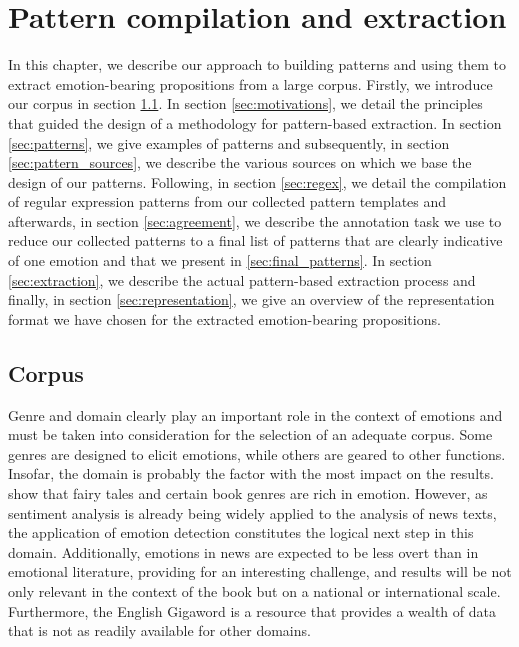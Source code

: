 
\chapter{Pattern compilation and extraction} %

\label{ch:patterns} %

In this chapter, we describe our approach to building patterns and using them to extract emotion-bearing propositions from a large corpus. Firstly, we introduce our corpus in section \ref{sec:corpus_selection}. In section \ref{sec:motivations}, we detail the principles that guided the design of a methodology for pattern-based extraction. In section \ref{sec:patterns}, we give examples of patterns and subsequently, in section \ref{sec:pattern_sources}, we describe the various sources on which we base the design of our patterns. Following, in section \ref{sec:regex}, we detail the compilation of regular expression patterns from our collected pattern templates and afterwards, in section \ref{sec:agreement}, we describe the annotation task we use to reduce our collected patterns to a final list of patterns that are clearly indicative of one emotion and that we present in \ref{sec:final_patterns}. In section \ref{sec:extraction}, we describe the actual pattern-based extraction process and finally, in section \ref{sec:representation}, we give an overview of the representation format we have chosen for the extracted emotion-bearing propositions.

\section{Corpus} \label{sec:corpus_selection}

Genre and domain clearly play an important role in the context of emotions and must be taken into consideration for the selection of an adequate corpus. Some genres are designed to elicit emotions, while others are geared to other functions. Insofar, the domain is probably the factor with the most impact on the results. \cite{emotions_novels_fairy_tales} show that fairy tales and certain book genres are rich in emotion. However, as sentiment analysis is already being widely applied to the analysis of news texts, the application of emotion detection constitutes the logical next step in this domain. Additionally, emotions in news are expected to be less overt than in emotional literature, providing for an interesting challenge, and results will be not only relevant in the context of the book but on a national or international scale. Furthermore, the English Gigaword is a resource that provides a wealth of data that is not as readily available for other domains.

